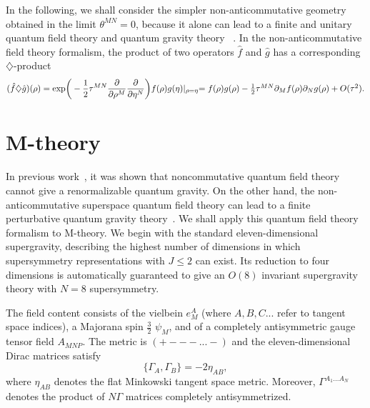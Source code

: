 \documentclass[a4paper,12pt]{article}
\begin{document}
In the following, we shall consider the simpler non-anticommutative
geometry obtained in the limit $\theta^{MN}=0$, because it alone can lead
to a finite and unitary quantum field theory and quantum gravity theory
~\cite{Moffat,Moffat2,Moffat3}. In the non-anticommutative field theory
formalism, the product of two operators ${\hat f}$ and ${\hat g}$ has a
corresponding $\diamondsuit$-product
\begin{equation}
({\hat f}\diamondsuit
{\hat g})(\rho)
=\exp\biggr(-\frac{1}{2}\tau^{MN}\frac{\partial}{\partial\rho^M}\frac{\partial}
{\partial\eta^N}\biggr)f(\rho)g(\eta)\vert_{\rho=\eta}
$$ $$
=f(\rho)g(\rho)-\frac{1}{2}\tau^{MN}\partial_M f(\rho)\partial_N
g(\rho)+O(\tau^2).
\end{equation}

\section{\bf M-theory}

In previous work~\cite{Moffat5}, it was shown that
noncommutative quantum field theory cannot give a renormalizable
quantum gravity. On the other hand, the non-anticommutative superspace
quantum field theory can lead to a finite perturbative quantum gravity
theory~\cite{Moffat,Moffat2,Moffat3}. We shall apply this quantum field
theory formalism to M-theory. We begin with the standard eleven-dimensional
supergravity, describing the highest number of dimensions in which
supersymmetry representations with $J\leq 2$ can exist. Its reduction to
four dimensions is automatically guaranteed to give an $O(8)$ invariant
supergravity theory with $N=8$ supersymmetry.

The field content consists of the vielbein $e^A_M$ (where $A,B,C...$ refer
to tangent space indices), a
Majorana spin $\frac{3}{2}$ $\psi_M$, and of a completely antisymmetric
gauge tensor field $A_{MNP}$. The metric is $(+---...-)$ and the
eleven-dimensional Dirac matrices satisfy
\begin{equation}
\{\Gamma_A,\Gamma_B\}=-2\eta_{AB},
\end{equation}
where $\eta_{AB}$ denotes the flat Minkowski tangent space metric.
Moreover, $\Gamma^{A_1...A_N}$ denotes the product of $N\Gamma$ matrices
completely antisymmetrized.
\end{document}

